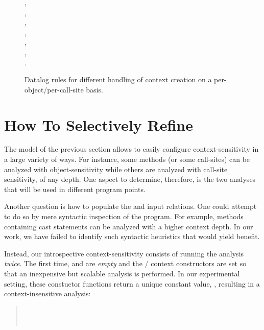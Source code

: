 \begin{figure}[h!tp]
\begin{datalog}
    , \\
    , \\
    ,\\
    , \\
    ,\\
    , \\
    .
\end{datalog}
\caption[]{Datalog rules for different handling of context creation on a per-object/per-call-site basis.}
\label{fig:introspect:rules}
\end{figure}


\section{How To Selectively Refine}
\label{sec:introspect:heuristics}

The model of the previous section allows to easily configure context-sensitivity in a large variety of ways. For instance, some methods (or some call-sites) can be analyzed with object-sensitivity while others are analyzed with call-site sensitivity, of any depth. One aspect to determine, therefore, is the two analyses that will be used in different program points.

Another question is how to populate the  and  input relations. One could attempt to do so by mere syntactic inspection of the program. For example, methods containing cast statements can be analyzed with a higher context depth. In our work, we have failed to identify such syntactic heuristics that would yield benefit.

Instead, our introspective context-sensitivity consists of running the analysis \emph{twice}. The first time,  and  are \emph{empty} and the / context constructors are set so that an inexpensive but scalable analysis is performed. In our experimental setting, these constuctor functions return a unique constant value, \args{$\star$}, resulting in a context-insensitive analysis:

\begin{quote}
\\
 \\
\end{quote}

